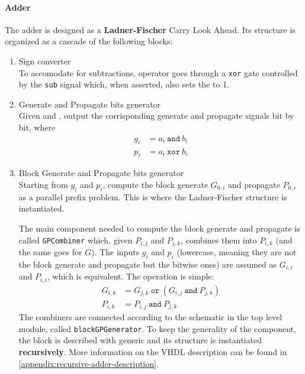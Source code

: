 \paragraph{Adder}
The adder is designed as a \textbf{Ladner-Fischer} Carry Look Ahead. Its structure is organized as a cascade of the following
blocks:
\begin{enumerate}
    \item Sign converter \\
    To accomodate for subtractions, operator  goes through a \texttt{xor} gate controlled by the
    \texttt{sub} signal which, when asserted, also sets the  to 1.

    \item Generate and Propagate bits generator \\
    Given  and , output the corrisponding generate and propagate signals bit by bit, where
    \begin{align*}
        g_i &= a_i\ \texttt{and}\ b_i \\
        p_i &= a_i\ \texttt{xor}\ b_i
    \end{align*}

    \item Block Generate and Propagate bits generator \\
    Starting from $g_i$ and $p_i$, compute the block generate $G_{0, i}$ and propagate $P_{0, i}$ as a parallel prefix
    problem. This is where the Ladner-Fischer structure is instantiated.

    The main component needed to compute the block generate and propagate is called \texttt{GPCombiner} which, given
    $P_{i, j}$ and $P_{j, k}$, combines them into $P_{i, k}$ (and the same goes for $G$). The inputs $g_i$ and $p_i$
    (lowercase, meaning they are not the block generate and propagate but the bitwise ones) are assumed as $G_{i, i}$
    and $P_{i, i}$, which is equivalent. The operation is simple:
    \begin{align*}
        G_{i, k} &= G_{j, k}\ \texttt{or}\  \left( G_{i, j}\ \texttt{and}\ P_{j, k} \right) \\
        P_{i, k} &= P_{i, j}\ \texttt{and}\ P_{j, k}
    \end{align*}
    The combiners are connected according to the schematic  in the top level module,
    called \texttt{blockGPGenerator}. To keep the generality of the component, the block is described with generic
    and its structure is instantiated \textbf{recursively}. More information on the VHDL description can be found in
    \autoref{appendix:recursive-adder-description}.


\end{enumerate}
